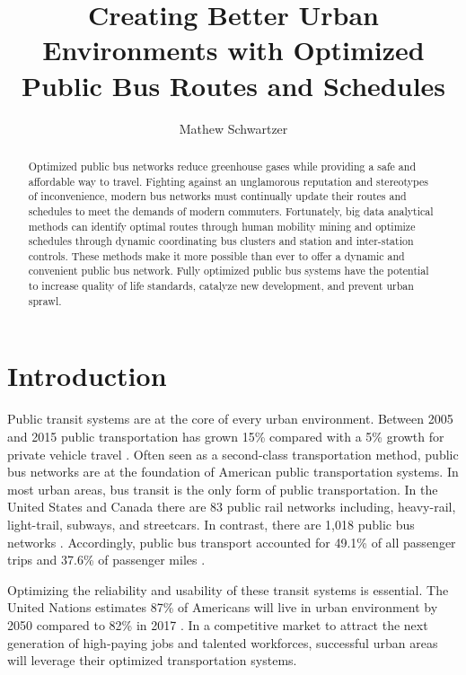 \documentclass[sigconf]{acmart}
\begin{document}
\title{Creating Better Urban Environments with Optimized Public Bus Routes and Schedules}

\author{Mathew Schwartzer}


\begin{abstract}
Optimized public bus networks reduce greenhouse gases while providing a safe and affordable way to travel. Fighting against an unglamorous reputation and stereotypes of inconvenience, modern bus networks must continually update their routes and schedules to meet the demands of modern commuters. Fortunately, big data analytical methods can identify optimal routes through human mobility mining and optimize schedules through dynamic coordinating bus clusters and station and inter-station controls. These methods make it more possible than ever to offer a dynamic and convenient public bus network. Fully optimized public bus systems have the potential to increase quality of life standards, catalyze new development, and prevent urban sprawl. 

\end{abstract}


\maketitle

\section{Introduction}
Public transit systems are at the core of every urban environment. Between 2005 and 2015 public transportation has grown 15\% compared with a 5\% growth for private vehicle travel \cite{Neff01}. Often seen as a second-class transportation method, public bus networks are at the foundation of American public transportation systems. In most urban areas, bus transit is the only form of public transportation. In the United States and Canada there are 83 public rail networks including, heavy-rail, light-trail, subways, and streetcars. In contrast, there are 1,018 public bus networks \cite{Neff01}. Accordingly, public bus transport accounted for 49.1\% of all passenger trips and 37.6\% of passenger miles \cite{Neff01}. 

Optimizing the reliability and usability of these transit systems is essential. The United Nations estimates 87\% of Americans will live in urban environment by 2050 compared to 82\% in 2017 \cite{Boyd01}. In a competitive market to attract the next generation of high-paying jobs and talented workforces, successful urban areas will leverage their optimized transportation systems. 
\end{document}
